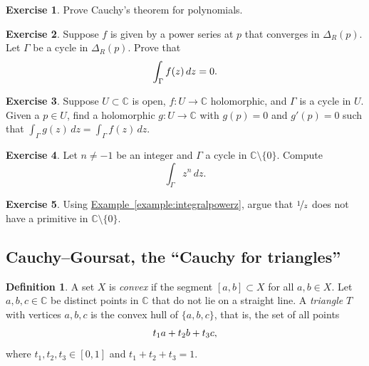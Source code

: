\documentclass[12pt,openany]{book}
\newcommand{\avoidbreak}{\postdisplaypenalty=100}
\newcommand{\C}{{\mathbb{C}}}
\newcommand{\myindex}[1]{#1\index{#1}}
\newcommand{\myquote}[1]{``#1''}
\theoremstyle{plain}
\theoremstyle{remark}
\theoremstyle{definition}
\newtheorem{defn}[thm]{Definition}
\newenvironment{exbox}{%
    \def\FrameCommand{\vrule width 1pt \relax\hspace{10pt}}%
    \MakeFramed{\advance\hsize-\width\FrameRestore}%
}{%
    \endMakeFramed
}
\theoremstyle{exercise}
\newtheorem{exercise}{Exercise}[section]
\theoremstyle{example}
\newcommand{\exerciseref}[1]{\hyperref[#1]{Exercise~\ref*{#1}}}
\newcommand{\exampleref}[1]{\hyperref[#1]{Example~\ref*{#1}}}
\begin{document}
\begin{exbox}
\begin{exercise}
Prove Cauchy's theorem for polynomials.
\end{exercise}

\begin{exercise}
Suppose $f$ is given by a power series at $p$ that converges in $\Delta_R(p)$.  Let
$\Gamma$ be a cycle in $\Delta_R(p)$.  Prove that
\begin{equation*}
\int_\Gamma f(z) \, dz = 0 .
\avoidbreak
\end{equation*}
\end{exercise}

\begin{exercise}
Suppose $U \subset \C$ is open, $f \colon U \to \C$ holomorphic, and
$\Gamma$ is a cycle in $U$.  
Given a $p \in U$, find a holomorphic $g \colon U \to \C$ with $g(p) = 0$
and $g'(p) = 0$ such that $\int_\Gamma g(z)\, dz = \int_\Gamma f(z) \, dz$.
\end{exercise}

\begin{exercise}
Let $n\not=-1$ be an integer and $\Gamma$ a cycle in $\C \setminus \{ 0 \}$.
Compute
\begin{equation*}
\int_\Gamma z^n \, dz .
\end{equation*}
\end{exercise}

\begin{exercise}
Using \exampleref{example:integralpowerz}, argue that $\nicefrac{1}{z}$ does
not have a primitive in $\C \setminus \{ 0 \}$.
\end{exercise}
\end{exbox}

\subsection{Cauchy--Goursat, the \myquote{Cauchy for triangles}}

\begin{defn}
A set $X$ is \emph{\myindex{convex}} if the segment $[a,b] \subset X$ for all $a,b \in
X$.
Let $a,b,c \in \C$ be distinct points in $\C$ that do not lie on a
straight line.
A \emph{\myindex{triangle}} $T$
with vertices $a,b,c$ is the convex hull
of $\{ a,b,c \}$, that is,
the set of all points
\begin{equation*}
t_1 a + t_2 b + t_3 c ,
\avoidbreak
\end{equation*}
where $t_1,t_2,t_3 \in [0,1]$ and $t_1+t_2+t_3 = 1$.
\end{defn}
\end{document}
